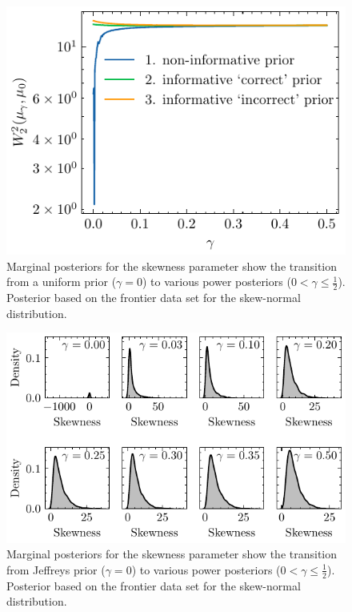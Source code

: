 \documentclass[12pt]{article}
\begin{document}
\begin{figure}
	\begin{center}
\includegraphics{imgs/inv_gamma_wasserstein_distance.pdf}
\end{center}
\caption{Marginal posteriors for the skewness parameter show the transition
from a uniform prior ($\gamma=0$) to various power posteriors
($0 < \gamma \leq  \frac{1}{2}$). Posterior based on the frontier data set for the
skew-normal distribution.}\label{fig:ref_skew_normal_powpos}
\end{figure}
\begin{figure}
\begin{center}
\includegraphics{imgs/Jeffreys.pdf}
\end{center}
\caption{Marginal posteriors for the skewness parameter show the transition
	from Jeffreys prior ($\gamma=0$) to various power posteriors
	($0<\gamma\leq \frac{1}{2}$).  Posterior based on the frontier data set for the
	skew-normal distribution. }\label{fig:skew_jeff_powpos}
\end{figure}
\end{document}
